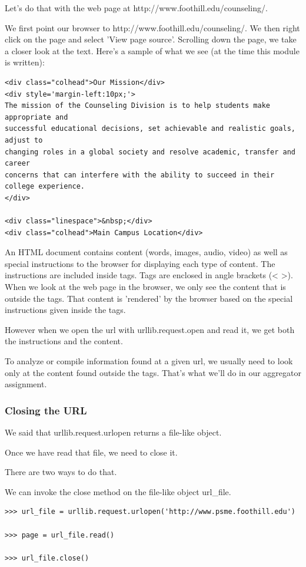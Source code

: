 \documentclass{article}
\begin{document}
Let's do that with the web page at http://www.foothill.edu/counseling/.

We first point our browser to http://www.foothill.edu/counseling/.  We then right click  on the page and select 'View page source'.  Scrolling down the page, we take a closer look at the text.  Here's a sample of what we see (at the time this module is written):

\begin{lstlisting}
<div class="colhead">Our Mission</div>
<div style='margin-left:10px;'>
The mission of the Counseling Division is to help students make appropriate and 
successful educational decisions, set achievable and realistic goals, adjust to 
changing roles in a global society and resolve academic, transfer and career 
concerns that can interfere with the ability to succeed in their college experience.
</div>
 
<div class="linespace">&nbsp;</div>
<div class="colhead">Main Campus Location</div>
\end{lstlisting}
 
An HTML document contains content (words, images, audio, video) as well as special instructions to the browser for displaying each type of content. The instructions are included inside tags. Tags are enclosed in angle brackets (< >).  When we look at the web page in the browser, we only see the content that is outside the tags.  That content is 'rendered' by the browser based on the special instructions given inside the tags.

However when we open the url with urllib.request.open and read it, we get both the instructions and the content.

To analyze or compile information found at a given url, we usually need to look only at the content found outside the tags.  That's what we'll do in our aggregator assignment.

\subsubsection{Closing the URL}

We said that urllib.request.urlopen returns a file-like object.

Once we have read that file, we need to close it.

There are two ways to do that.

We can invoke the close method on the file-like object url{\_}file.

\begin{lstlisting}
>>> url_file = urllib.request.urlopen('http://www.psme.foothill.edu') 

>>> page = url_file.read()

>>> url_file.close()
\end{lstlisting}
\end{document}
